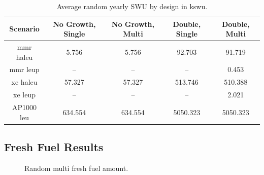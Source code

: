 \begin{table}[H]
    \centering
    \caption{Average random yearly SWU by design in k\gls{swu}.}
    \label{tab:random_swu_avg}
    \begin{tabular}{c c c c c}
       \hline
       Scenario & No Growth, Single & No Growth, Multi & Double, Single & Double, Multi  \\
       \hline
       \gls{mmr} \gls{haleu}   & 5.756   & 5.756   & 92.703    & 91.719   \\
       \gls{mmr} \gls{leup}    & --      & --      & --       & 0.453    \\
       \gls{xe} \gls{haleu}    & 57.327  & 57.327  & 513.746  & 510.388  \\
       \gls{xe} \gls{leup}     & --      & --      & --       & 2.021    \\
       AP1000 \gls{leu}        & 634.554 & 634.554 & 5050.323 & 5050.323 \\
       \hline
    \end{tabular}
\end{table}





\subsection{Fresh Fuel Results}
\label{sec:random_fresh}



\begin{figure}[H]
    \hfill
    \caption{Random multi fresh fuel amount.}
    \label{fig:random_mf_fresh}
  \end{figure}

